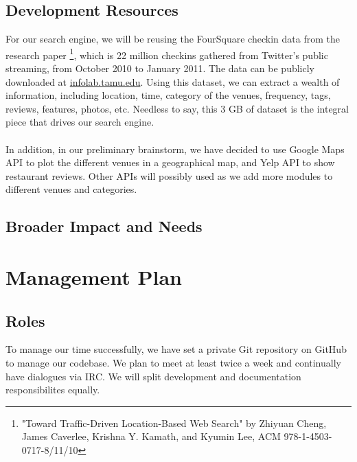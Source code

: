 \documentclass{article}
\begin{document}
\subsection{Development Resources}
For our search engine, we will be reusing the FourSquare checkin data from the research paper
\footnote{"Toward Traffic-Driven Location-Based Web Search" by Zhiyuan Cheng, James Caverlee, Krishna Y. Kamath, and Kyumin Lee, ACM 978-1-4503-0717-8/11/10},
which is 22 million checkins gathered from Twitter's public streaming, from October 2010 to January 2011. 
The data can be publicly downloaded at \href{http://infolab.tamu.edu/static/users/zhiyuan/icwsm_2011.zip}{infolab.tamu.edu}.
Using this dataset, we can extract a wealth of information, including location, time, category of the
venues, frequency, tags, reviews, features, photos, etc. Needless to say, this 3 GB of dataset is the
integral piece that drives our search engine.
\\ \\
In addition, in our preliminary brainstorm, we have decided to use Google Maps API to plot the different
venues in a geographical map, and Yelp API to show restaurant reviews. Other APIs will possibly used
as we add more modules to different venues and categories.

\subsection{Broader Impact and Needs}

\section{Management Plan}
\subsection{Roles}
To manage our time successfully, we have set a private Git repository on GitHub to manage our codebase. 
We plan to meet at least twice a week and continually have dialogues via IRC. We will split development
and documentation responsibilites equally.
\end{document}

